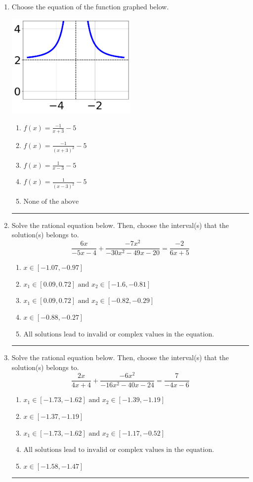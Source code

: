 \documentclass[14pt]{extbook}
\newcommand{\litem}[1]{\item#1\hspace*{-1cm}\rule{\textwidth}{0.4pt}}
\begin{document}
\begin{enumerate}
{\begin{enumerate}[label=\Alph*.]
\end{enumerate} }
\litem{
Choose the equation of the function graphed below.
\begin{center}
    \includegraphics[width=0.5\textwidth]{../Figures/rationalGraphToEquationCopyB.png}
\end{center}
\begin{enumerate}[label=\Alph*.]
\item \( f(x) = \frac{-1}{x + 3} - 5 \)
\item \( f(x) = \frac{-1}{(x + 3)^2} - 5 \)
\item \( f(x) = \frac{1}{x - 3} - 5 \)
\item \( f(x) = \frac{1}{(x - 3)^2} - 5 \)
\item \( \text{None of the above} \)

\end{enumerate} }
\litem{
Solve the rational equation below. Then, choose the interval(s) that the solution(s) belongs to.\[ \frac{6x}{-5x -4} + \frac{-7x^{2}}{-30x^{2} -49 x -20} = \frac{-2}{6x + 5} \]\begin{enumerate}[label=\Alph*.]
\item \( x \in [-1.07,-0.97] \)
\item \( x_1 \in [0.09, 0.72] \text{ and } x_2 \in [-1.6,-0.81] \)
\item \( x_1 \in [0.09, 0.72] \text{ and } x_2 \in [-0.82,-0.29] \)
\item \( x \in [-0.88,-0.27] \)
\item \( \text{All solutions lead to invalid or complex values in the equation.} \)

\end{enumerate} }
\litem{
Solve the rational equation below. Then, choose the interval(s) that the solution(s) belongs to.\[ \frac{2x}{4x + 4} + \frac{-6x^{2}}{-16x^{2} -40 x -24} = \frac{7}{-4x -6} \]\begin{enumerate}[label=\Alph*.]
\item \( x_1 \in [-1.73, -1.62] \text{ and } x_2 \in [-1.39,-1.19] \)
\item \( x \in [-1.37,-1.19] \)
\item \( x_1 \in [-1.73, -1.62] \text{ and } x_2 \in [-1.17,-0.52] \)
\item \( \text{All solutions lead to invalid or complex values in the equation.} \)
\item \( x \in [-1.58,-1.47] \)

\end{enumerate} }
\end{enumerate}
\end{document}
